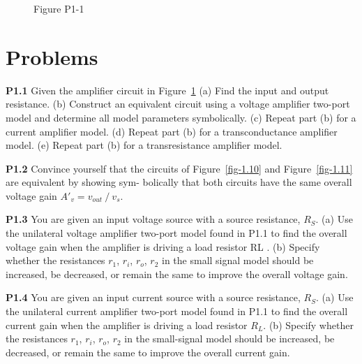 \documentclass[
  11pt,
  letterpaper,
  abstract]{scrbook}
\begin{document}
\begin{figure}


\caption{\label{fig-p1-1}Figure P1-1}

\end{figure}%

\chapter{Problems}\label{problems}

\textbf{P1.1} Given the amplifier circuit in Figure~\ref{fig-p1-1} (a)
Find the input and output resistance. (b) Construct an equivalent
circuit using a voltage amplifier two-port model and determine all model
parameters symbolically. (c) Repeat part (b) for a current amplifier
model. (d) Repeat part (b) for a transconductance amplifier model. (e)
Repeat part (b) for a transresistance amplifier model.

\textbf{P1.2} Convince yourself that the circuits of
Figure~\ref{fig-1.10} and Figure~\ref{fig-1.11} are equivalent by
showing sym- bolically that both circuits have the same overall voltage
gain \(A'_v = v_{out} ⁄ v_s\).

\textbf{P1.3} You are given an input voltage source with a source
resistance, \(R_S\). (a) Use the unilateral voltage amplifier two-port
model found in P1.1 to find the overall voltage gain when the amplifier
is driving a load resistor RL . (b) Specify whether the resistances
\(r_1\), \(r_i\), \(r_o\), \(r_2\) in the small signal model should be
increased, be decreased, or remain the same to improve the overall
voltage gain.

\textbf{P1.4} You are given an input current source with a source
resistance, \(R_S\). (a) Use the unilateral current amplifier two-port
model found in P1.1 to find the overall current gain when the amplifier
is driving a load resistor \(R_L\). (b) Specify whether the resistances
\(r_1\), \(r_i\), \(r_o\), \(r_2\) in the small-signal model should be
increased, be decreased, or remain the same to improve the overall
current gain.
\end{document}
